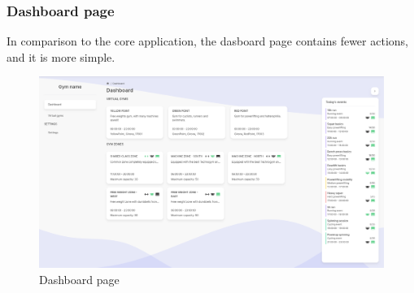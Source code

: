 \documentclass[a4paper, 12pt, oneside]{book}
\begin{document}
\subsubsection{Dashboard page}
In comparison to the core application, the dasboard page contains fewer actions, and it is more simple.
\begin{figure}[H]
	\centering
	\includegraphics[width=\textwidth]{assets/client-screenshots/dashboard.png}
	\caption{Dashboard page}
\end{figure}
\end{document}
